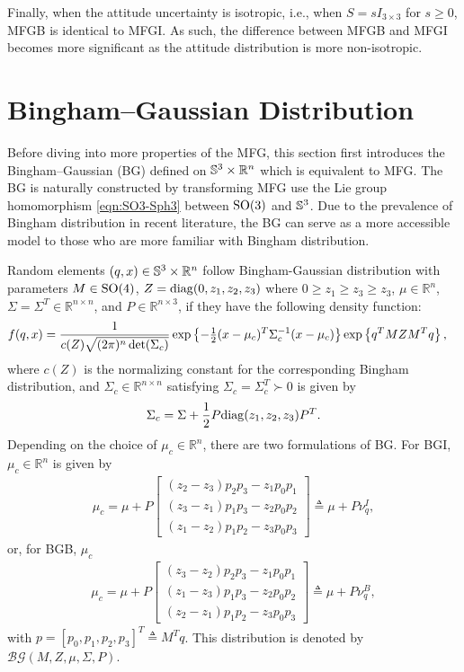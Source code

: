 Finally, when the attitude uncertainty is isotropic, i.e., when $S=sI_{3\times 3}$ for $s \geq 0$, MFGB is identical to MFGI.
As such, the difference between MFGB and MFGI becomes more significant as the attitude distribution is more non-isotropic.

\section{Bingham--Gaussian Distribution}

Before diving into more properties of the MFG, this section first introduces the Bingham--Gaussian (BG) defined on $\mathbb{S}^3\times \mathbb{R}^n$ which is equivalent to MFG.
The BG is naturally constructed by transforming MFG use the Lie group homomorphism \eqref{eqn:SO3-Sph3} between $\mathrm{SO}(3)$ and $\mathbb{S}^3$.
Due to the prevalence of Bingham distribution in recent literature, the BG can serve as a more accessible model to those who are more familiar with Bingham distribution.

\begin{definition}
	Random elements $(q,x)\in\mathbb{S}^3\times\mathbb{R}^n$ follow Bingham-Gaussian distribution with parameters $M\in\mathrm{SO}(4)$, $Z = \mathrm{diag}(0,z_1,z_2,z_3)$ where $0\geq z_1 \geq z_3 \geq z_3$, $\mu\in\mathbb{R}^n$, $\Sigma=\Sigma^T\in\mathbb{R}^{n\times n}$, and $P\in\mathbb{R}^{n\times 3}$, if they have the following density function:
	\begin{align} \label{eqn:BG-density}
		&f(q,x) = \frac{1}{c(Z)\sqrt{(2\pi)^n\det(\Sigma_c)}} \exp\left\{  -\tfrac{1}{2}(x-\mu_c)^T \Sigma_c^{-1} (x-\mu_c)  \right\} \exp\left\{ q^TMZM^Tq \right\} ,
	\end{align}
	where $c(Z)$ is the normalizing constant for the corresponding Bingham distribution, and $\Sigma_c\in\mathbb{R}^{n\times n}$ satisfying $\Sigma_c = \Sigma_c^T \succ 0$ is given by
	\begin{align}
		\Sigma_c = \Sigma + \frac{1}{2}P\mathrm{diag}(z_1,z_2,z_3)P^T.
	\end{align}
	Depending on the choice of $\mu_c\in\mathbb{R}^n$, there are two formulations of BG. 
	For BGI, $\mu_c\in\mathbb{R}^n$ is given by
	\begin{align} \label{eqn:BG-vq-BGI}
		\mu_c = \mu + P\begin{bmatrix} (z_2-z_3)p_2p_3 - z_1p_0p_1 \\ (z_3-z_1)p_1p_3 - z_2p_0p_2 \\ (z_1-z_2)p_1p_2 - z_3p_0p_3 \end{bmatrix} \triangleq \mu + P\nu_q^I,
	\end{align}
	or, for BGB, $\mu_c$
	\begin{align} \label{eqn:BG-vq-BGB}
		\mu_c = \mu + P\begin{bmatrix} (z_3-z_2)p_2p_3 - z_1p_0p_1 \\ (z_1-z_3)p_1p_3 - z_2p_0p_2 \\ (z_2-z_1)p_1p_2 - z_3p_0p_3 \end{bmatrix} \triangleq \mu + P\nu_q^B,
	\end{align}
	with $p = [p_0, p_1, p_2, p_3]^T \triangleq M^Tq$.
	This distribution is denoted by $\mathcal{BG}(M,Z,\mu,\Sigma,P)$.
\end{definition}

